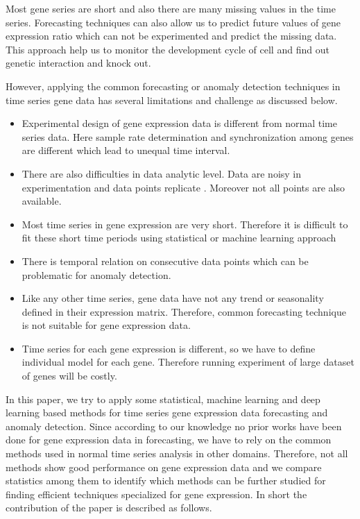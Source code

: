 Most gene series are short and also there are many missing values in the time series. Forecasting techniques can also allow us to predict future values of gene expression ratio which can not be experimented and predict the missing data. This approach help us to monitor the development cycle of cell and find out genetic interaction and knock out.  

However, applying the common forecasting or anomaly detection techniques in time series gene data has several limitations and challenge as discussed below.

\begin{itemize}
    \item Experimental design of gene expression data is different from normal time series data. Here sample rate determination and synchronization among genes are different which lead to unequal time interval. 
    \item There are also difficulties in data analytic level. Data are noisy in experimentation and data points  replicate \cite{review paper}. Moreover not all points are also available. 
    \item Most time series in gene expression are very short. Therefore it is difficult to fit these short time periods using statistical or machine learning approach
    \item There is temporal relation on consecutive data points which can be problematic for anomaly detection.
    \item Like any other time series, gene data have not any trend or seasonality defined in their expression matrix. Therefore, common forecasting technique is not suitable for gene expression data.
    \item Time series for each gene expression is different, so we have to define individual model for each gene. Therefore running experiment of large dataset of genes will be costly.

\end{itemize}

In this paper, we try to apply some statistical, machine learning and deep learning based methods for time series gene expression data forecasting and anomaly detection. Since according to our knowledge no prior works have been done for gene expression data in forecasting, we have to rely on the common methods used in normal time series analysis in other domains. Therefore, not all methods show good performance on gene expression data and we compare statistics among them to identify which methods can be further studied for finding efficient techniques specialized for gene expression. In short the contribution of the paper is described as follows.


